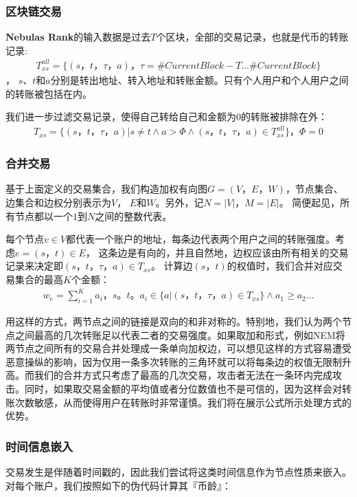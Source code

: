 \subsubsection{区块链交易}\label{subsec:transfer}
\textbf{Nebulas Rank}的输入数据是过去$T$个区块，全部的交易记录，也就是代币的转账记录:
\begin{align}
	T_{xs}^{all} = \{(s，t，\tau， a)， \tau = \#CurrentBlock-T \dots \#CurrentBlock \}
\end{align}
， $s$、$t$和$a$分别是转出地址、转入地址和转账金额。只有个人用户和个人用户之间的转账被包括在内。

我们进一步过滤交易记录，使得自己转给自己和金额为0的转账被排除在外：
\begin{align}
	T_{xs} = \{(s，t，\tau， a)| s \neq t \land a > \Phi \land (s，t，\tau， a) \in T_{xs}^{all} \}， \Phi = 0
\end{align}

\subsubsection{合并交易} \label{subsec:aggreate}
基于上面定义的交易集合，我们构造加权有向图$G=(V， E， W)$，节点集合、边集合和边权分别表示为$V$， $E$和$W$。另外，记$N = |V|$，$M = |E|$。 简便起见，所有节点都以一个$1$到$N$之间的整数代表。

每个节点$v \in V$都代表一个账户的地址，每条边代表两个用户之间的转账强度。考虑$e=(s，t) \in E$， 这条边是有向的，并且自然地，边权应该由所有相关的交易记录来决定即$(s，t，\tau， a) \in T_{xs}$。 计算边$(s，t)$的权值时，我们合并对应交易集合的最高$K$个金额：
\begin{align}\label{formula:edgeweight}
w_e = \sum_{i=1}^K a_i， s。t。 a_i \in \{a|(s，t，\tau，a) \in T_{xs} \} \land a_1 \geq a_2 \dots
\end{align}

用这样的方式，两节点之间的链接是双向的和非对称的。特别地，我们认为两个节点之间最高的几次转账足以代表二者的交易强度。如果取加和形式，例如NEM将两节点之间所有的交易合并处理成一条单向加权边\cite{nem}，可以想见这样的方式容易遭受恶意操纵的影响，因为仅用一条多次转账的三角环就可以将每条边的权值无限制升高。而我们的合并方式只考虑了最高的几次交易，攻击者无法在一条环内完成攻击。同时，如果取交易金额的平均值或者分位数值也不是可信的，因为这样会对转账次数敏感，从而使得用户在转账时非常谨慎。我们将在展示公式\label{formula:edgeweight}所示处理方式的优势。

\subsubsection{时间信息嵌入} \label{subsec:coinage}
交易发生是伴随着时间戳的，因此我们尝试将这类时间信息作为节点性质来嵌入。对每个账户，我们按照如下的伪代码计算其『币龄』：

